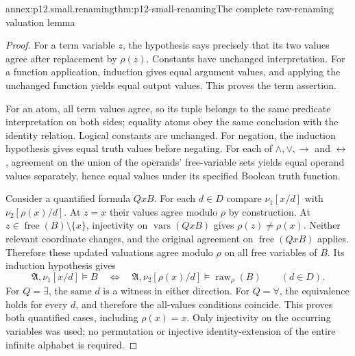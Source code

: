 \begin{annexitem}{annex:p12.small.renaming}{thm:p12-small-renaming}{The complete raw-renaming valuation lemma}
\begin{proof}
For a term variable \(z\), the hypothesis says precisely that
its two values agree after replacement by \(\rho(z)\).
Constants have unchanged interpretation. For a function application,
induction gives equal argument values, and applying the unchanged
function yields equal output values. This proves the term assertion.

For an atom, all term values agree, so its tuple belongs to the
same predicate interpretation on both sides; equality atoms obey
the same conclusion with the identity relation. Logical constants
are unchanged. For negation, the induction hypothesis gives equal
truth values before negating. For each of \(\land,\lor,\to\)
and \(\leftrightarrow\), agreement on the union of the operands'
free-variable sets yields equal operand values separately, hence
equal values under its specified Boolean truth function.

Consider a quantified formula \(Qx B\). For each \(d\in D\)
compare \(\nu_1[x/d]\) with \(\nu_2[\rho(x)/d]\).
At \(z=x\) their values agree modulo \(\rho\) by construction.
At \(z\in\operatorname{free}(B)\setminus\{x\}\), injectivity
on \(\operatorname{vars}(Qx B)\) gives
\(\rho(z)\ne\rho(x)\). Neither relevant coordinate changes,
and the original agreement on
\(\operatorname{free}(Qx B)\) applies. Therefore these updated
valuations agree modulo \(\rho\) on all free variables of \(B\).
Its induction hypothesis gives
\[
 \mathfrak A,\nu_1[x/d]\models B
 \quad\Longleftrightarrow\quad
 \mathfrak A,\nu_2[\rho(x)/d]\models\operatorname{raw}_\rho(B)
 \qquad(d\in D).
\]
For \(Q=\exists\), the same \(d\) is a witness in either
direction. For \(Q=\forall\), the equivalence holds for every
\(d\), and therefore the all-values conditions coincide.
This proves both quantified cases, including \(\rho(x)=x\).
Only injectivity on the occurring variables was used; no permutation
or injective identity-extension of the entire infinite alphabet is
required.
\end{proof}
\end{annexitem}

